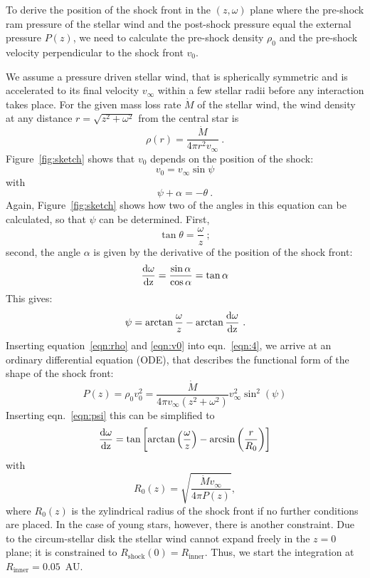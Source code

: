 To derive the position of the shock front in the $(z, \omega)$ plane where the pre-shock ram pressure of the stellar wind and the post-shock pressure equal the external pressure $P(z)$, we need to calculate the pre-shock density $\rho_0$ and the pre-shock velocity perpendicular to the shock front $v_0$.

We assume a pressure driven stellar wind, that is spherically symmetric and is accelerated to its final velocity $v_{\infty}$ within a few stellar radii before any interaction takes place. For the given mass loss rate $\dot M$ of the stellar wind, the wind density at any distance $r=\sqrt{z^2+\omega^2}$ from the central star is 
\begin{equation}\label{eqn:rho}
\rho(r) = \frac{\dot M}{4 \pi r^2 v_{\infty}}\ .
\end{equation}
Figure~\ref{fig:sketch} shows that $v_0$ depends on the position of the shock:
\begin{equation}
\label{eqn:v0}v_0 = v_{\infty} \sin \psi
\end{equation}
with 
\begin{equation}\label{eqn:angle}
\psi+\alpha = - \theta \ .
\end{equation}
Again, Figure~\ref{fig:sketch} shows how two of the angles in this equation can be calculated, so that $\psi$ can be determined. First,
\begin{equation}\label{eqn:theta}
\tan\theta = \frac{\omega}{z}\ ;
\end{equation}
second, the angle $\alpha$ is given by the derivative of the position of the shock front:
\begin{equation}\label{eqn:deriv}
\frac{\rm{d}\omega}{\rm{d}z} = \frac{\sin \alpha}{\cos \alpha} = \tan{\alpha}
\end{equation}
This gives:
\begin{equation}\label{eqn:psi}
\psi = \arctan{\frac{\omega}{z}} - \arctan{\frac{\rm{d}\omega}{\rm{d}z}}\ .
\end{equation}
Inserting equation~\ref{eqn:rho} and \ref{eqn:v0} into eqn.~\ref{eqn:4}, we arrive at an ordinary differential equation (ODE), that describes the functional form of the shape of the shock front:
\begin{equation}
P(z) = \rho_0v_0^2 = \frac{\dot{M}}{4\pi v_{\infty}(z^2+\omega^2)} v_{\infty}^2 \sin^2(\psi)
\end{equation}
Inserting eqn.~\ref{eqn:psi} this can be simplified to
\begin{equation}\label{eqn:ode}
\frac{\rm{d}\omega}{\rm{d}z} = \tan\left[\arctan\left(\frac{\omega}{z}\right)-\arcsin\left(\frac{r}{R_0}\right)\right]
\end{equation}
with
\begin{equation}
R_0(z) = \sqrt{\frac{\dot{M} v_{\infty}}{4\pi P(z)}},
\end{equation}
where $R_0(z)$ is the zylindrical radius of the shock front if no further conditions are placed. In the case of young stars, however, there is another constraint. Due to the circum-stellar disk the stellar wind cannot expand freely in the $z=0$ plane; it is constrained to $R_{\textrm{shock}}(0) = R_{\textrm{inner}}$. Thus, we start the integration at $R_{\textrm{inner}} = 0.05$~AU.

